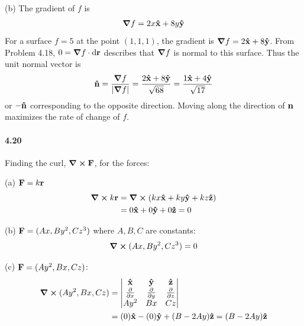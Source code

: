 \documentclass[../problems.tex]{subfiles}
\begin{document}
(b) The gradient of $f$ is
\begin{align*}
    \grad{f} = 2x \vu{x} + 8y \vu{y}
\end{align*}
For a surface $f=5$ at the point $(1, 1, 1)$, the gradient is $\grad{f} = 2 \vu{x} + 8 \vu{y}$. From
Problem 4.18, $0 = \grad{f} \cdot \dd{\vb{r}}$ describes that $\grad{f}$ is normal to this surface.
Thus the unit normal vector is
\begin{align*}
    \vu{n} = \frac{\grad{f}}{\abs{\grad{f}}} = \frac{2 \vu{x} + 8 \vu{y}}{\sqrt{68}}
        = \frac{1 \vu{x} + 4 \vu{y}}{\sqrt{17}}
\end{align*}
or $-\vu{n}$ corresponding to the opposite direction. Moving along the direction of $\vb{n}$
maximizes the rate of change of $f$.

\paragraph{4.20}
Finding the curl, $\curl{\vb{F}}$, for the forces:

(a) $\vb{F} = k\vb{r}$
\begin{align*}
    \curl{k\vb{r}} &= \curl(kx \vu{x} + ky \vu{y} + kz \vu{z}) \\
    &= 0 \vu{x} + 0 \vu{y} + 0 \vu{z} = 0
\end{align*}

(b) $\vb{F} = (Ax, By^2, Cz^3)$ where $A,B,C$ are constants:
\begin{align*}
    \curl{(Ax, By^2, Cz^3)} = 0
\end{align*}

(c) $\vb{F} = (Ay^2, Bx, Cz)$:
\begin{align*}
    \curl{(Ay^2, Bx, Cz)} &= 
    \begin{vmatrix}
        \vu{x} & \vu{y} & \vu{z} \\
        \pdv{x} & \pdv{y} & \pdv{z} \\
        Ay^2 & Bx & Cz
    \end{vmatrix} \\
    &= (0) \vu{x} - (0) \vu{y} + (B - 2Ay) \vu{z} = (B - 2Ay) \vu{z}
\end{align*}
\end{document}
